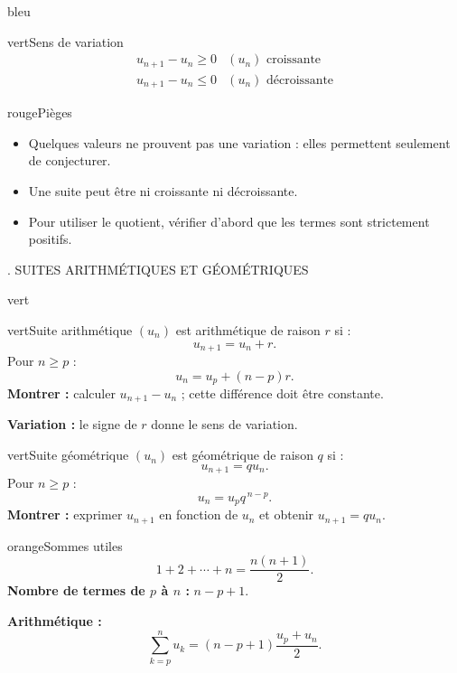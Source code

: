 \documentclass[11pt,a4paper]{article}
\newcommand{\Un}{\ensuremath{(u_n)}}
\newcommand{\tagcol}[2]{\begin{tcolorbox}[enhanced,colback=#1!11,colframe=#1!45!black,boxrule=0.42pt,arc=2mm,left=1mm,right=1mm,top=0.45mm,bottom=0.45mm,before skip=0mm,after skip=0.85mm,fontupper=\bfseries\scriptsize,colupper=#1!55!black]\centering #2\end{tcolorbox}}
\begin{document}
\begin{landscape}
\begin{minipage}[t]{0.242\linewidth}
\begin{panel}{bleu}
\begin{fichebox}{vert}{Sens de variation}
\[
\begin{array}{c|c}
 u_{n+1}-u_n\geq 0 & \Un{} \text{ croissante}\\
 u_{n+1}-u_n\leq 0 & \Un{} \text{ décroissante}
\end{array}
\]
\end{fichebox}

\begin{fichebox}{rouge}{Pièges}
\begin{itemize}
    \item Quelques valeurs ne prouvent pas une variation : elles permettent seulement de conjecturer.
    \item Une suite peut être ni croissante ni décroissante.
    \item Pour utiliser le quotient, vérifier d'abord que les termes sont strictement positifs.
\end{itemize}
\end{fichebox}

\end{panel}
\end{minipage}
\hfill
\begin{minipage}[t]{0.242\linewidth}
\tagcol{vert}{2. SUITES ARITHMÉTIQUES ET GÉOMÉTRIQUES}
\begin{panel}{vert}

\begin{fichebox}{vert}{Suite arithmétique}
\Un{} est arithmétique de raison $r$ si :
\[
 u_{n+1}=u_n+r.
\]
Pour $n\geq p$ :
\[
 u_n=u_p+(n-p)r.
\]
\textbf{Montrer :} calculer $u_{n+1}-u_n$ ; cette différence doit être constante.

\textbf{Variation :} le signe de $r$ donne le sens de variation.
\end{fichebox}

\begin{fichebox}{vert}{Suite géométrique}
\Un{} est géométrique de raison $q$ si :
\[
 u_{n+1}=q u_n.
\]
Pour $n\geq p$ :
\[
 u_n=u_p q^{\,n-p}.
\]
\textbf{Montrer :} exprimer $u_{n+1}$ en fonction de $u_n$ et obtenir $u_{n+1}=q u_n$.
\end{fichebox}

\begin{fichebox}{orange}{Sommes utiles}
\[
1+2+\cdots+n=\frac{n(n+1)}2.
\]
\textbf{Nombre de termes de $p$ à $n$ :} $n-p+1$.

\textbf{Arithmétique :}
\[
\sum_{k=p}^{n}u_k=(n-p+1)\frac{u_p+u_n}{2}.
\]


\end{fichebox}
\end{panel}
\end{minipage}
\end{landscape}
\end{document}
